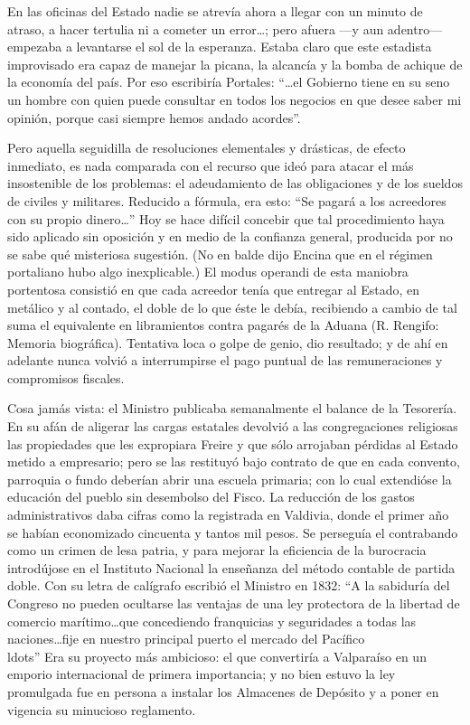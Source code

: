 \documentclass[10pt,twoside,openright]{memoir}
\begin{document}
En las oficinas del Estado nadie se atrevía ahora a llegar con un minuto
de atraso, a hacer tertulia ni a cometer un error\ldots; pero afuera ---y
aun adentro--- empezaba a levantarse el sol de la esperanza. Estaba
claro que este estadista improvisado era capaz de manejar la picana, la
alcancía y la bomba de achique de la economía del país. Por eso
escribiría Portales: ``\ldots{}el Gobierno tiene en su seno un hombre
con quien puede consultar en todos los negocios en que desee saber mi
opinión, porque casi siempre hemos andado acordes''.

Pero aquella seguidilla de resoluciones elementales y drásticas, de
efecto inmediato, es nada comparada con el recurso que ideó para atacar
el más insostenible de los problemas: el adeudamiento de las
obligaciones y de los sueldos de civiles y militares. Reducido a
fórmula, era esto: ``Se pagará a los acreedores con su propio dinero\ldots''
Hoy se hace difícil concebir que tal procedimiento haya sido aplicado
sin oposición y en medio de la confianza general, producida por no se
sabe qué misteriosa sugestión. (No en balde dijo Encina que en el
régimen portaliano hubo algo inexplicable.) El modus operandi de esta
maniobra portentosa consistió en que cada acreedor tenía que entregar al
Estado, en metálico y al contado, el doble de lo que éste le debía,
recibiendo a cambio de tal suma el equivalente en libramientos contra
pagarés de la Aduana (R. Rengifo: Memoria biográfica). Tentativa loca o
golpe de genio, dio resultado; y de ahí en adelante nunca volvió a
interrumpirse el pago puntual de las remuneraciones y compromisos
fiscales.

Cosa jamás vista: el Ministro publicaba semanalmente el balance de la
Tesorería. En su afán de aligerar las cargas estatales devolvió a las
congregaciones religiosas las propiedades que les expropiara Freire y
que sólo arrojaban pérdidas al Estado metido a empresario; pero se las
restituyó bajo contrato de que en cada convento, parroquia o fundo
deberían abrir una escuela primaria; con lo cual extendióse la educación
del pueblo sin desembolso del Fisco. La reducción de los gastos
administrativos daba cifras como la registrada en Valdivia, donde el
primer año se habían economizado cincuenta y tantos mil pesos. Se
perseguía el contrabando como un crimen de lesa patria, y para mejorar
la eficiencia de la burocracia introdújose en el Instituto Nacional la
enseñanza del método contable de partida doble. Con su letra de
calígrafo escribió el Ministro en 1832: ``A la sabiduría del Congreso no
pueden ocultarse las ventajas de una ley protectora de la libertad de
comercio marítimo\ldots que concediendo franquicias y seguridades a todas
las naciones\ldots fije en nuestro principal puerto el mercado del
Pacífico\\ldots'' Era su proyecto más ambicioso: el que convertiría a
Valparaíso en un emporio internacional de primera importancia; y no bien
estuvo la ley promulgada fue en persona a instalar los Almacenes de
Depósito y a poner en vigencia su minucioso reglamento.
\end{document}
